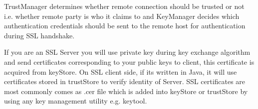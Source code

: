 TrustManager determines whether remote connection should be trusted or not i.e. whether remote party is who it claims to and KeyManager decides which authentication credentials should be sent to the remote host for authentication during SSL handshake.

If you are an SSL Server you will use private key during key exchange algorithm and send certificates corresponding to your public keys to client, this certificate is acquired from keyStore. On SSL client side, if its written in Java, it will use certificates stored in trustStore to verify identity of Server. SSL certificates are most commonly comes as .cer file which is added into keyStore or trustStore by using any key management utility e.g. keytool.